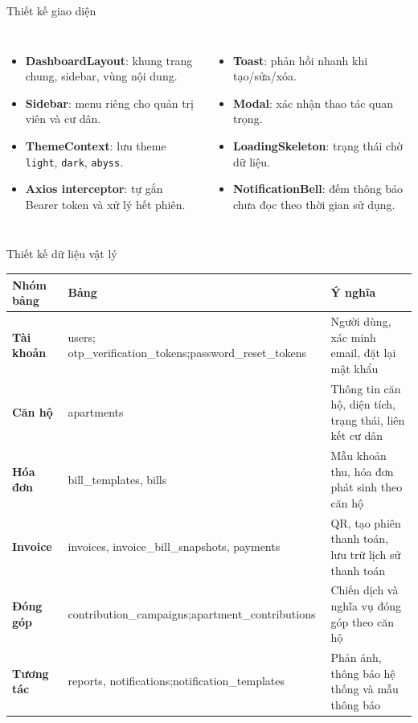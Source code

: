 \documentclass[t, aspectratio=169]{beamer}
\newcommand{\keyword}[1]{\textcolor{hustprimary}{\textbf{#1}}}
\newcommand{\tech}[1]{\textcolor{diagramBlue}{\texttt{\footnotesize #1}}}
\begin{document}
\begin{frame}{Thiết kế giao diện}
\begin{columns}[T,onlytextwidth]
\begin{itemize}
  \item \keyword{DashboardLayout}: khung trang chung, sidebar, vùng nội dung.
  \item \keyword{Sidebar}: menu riêng cho quản trị viên và cư dân.
  \item \keyword{ThemeContext}: lưu theme \tech{light}, \tech{dark}, \tech{abyss}.
  \item \keyword{Axios interceptor}: tự gắn Bearer token và xử lý hết phiên.
\end{itemize}
\begin{itemize}
  \item \keyword{Toast}: phản hồi nhanh khi tạo/sửa/xóa.
  \item \keyword{Modal}: xác nhận thao tác quan trọng.
  \item \keyword{LoadingSkeleton}: trạng thái chờ dữ liệu.
  \item \keyword{NotificationBell}: đếm thông báo chưa đọc theo thời gian sử dụng.
\end{itemize}
\end{columns}

\end{frame}

\begin{frame}{Thiết kế dữ liệu vật lý}
\scriptsize
\renewcommand{\arraystretch}{1.16}
\begin{tabularx}{\textwidth}{>{\bfseries}P{1.95cm} P{5.35cm} Q}
\toprule
Nhóm bảng & Bảng & Ý nghĩa\\
\midrule
Tài khoản & users; otp\_verification\_tokens;\newline password\_reset\_tokens & Người dùng, xác minh email, đặt lại mật khẩu\\
Căn hộ & apartments & Thông tin căn hộ, diện tích, trạng thái, liên kết cư dân\\
Hóa đơn & bill\_templates, bills & Mẫu khoản thu, hóa đơn phát sinh theo căn hộ\\
Invoice & invoices, invoice\_bill\_snapshots, payments & QR, tạo phiên thanh toán, lưu trữ lịch sử thanh toán\\
Đóng góp & contribution\_campaigns;\newline apartment\_contributions & Chiến dịch và nghĩa vụ đóng góp theo căn hộ\\
Tương tác & reports, notifications;\newline notification\_templates & Phản ánh, thông báo hệ thống và mẫu thông báo\\
\bottomrule
\end{tabularx}
\end{frame}
\end{document}
